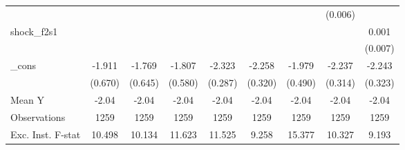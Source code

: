 {\begin{tabular}{l*{8}{c}}
            &                     &                     &                     &                     &                     &                     &     (0.006)         &                     \\
\addlinespace
shock\_f2s1  &                     &                     &                     &                     &                     &                     &                     &       0.001         \\
            &                     &                     &                     &                     &                     &                     &                     &     (0.007)         \\
\addlinespace
\_cons      &      -1.911\sym{***}&      -1.769\sym{***}&      -1.807\sym{***}&      -2.323\sym{***}&      -2.258\sym{***}&      -1.979\sym{***}&      -2.237\sym{***}&      -2.243\sym{***}\\
            &     (0.670)         &     (0.645)         &     (0.580)         &     (0.287)         &     (0.320)         &     (0.490)         &     (0.314)         &     (0.323)         \\
\midrule
Mean Y      &       -2.04         &       -2.04         &       -2.04         &       -2.04         &       -2.04         &       -2.04         &       -2.04         &       -2.04         \\
Observations&        1259         &        1259         &        1259         &        1259         &        1259         &        1259         &        1259         &        1259         \\
Exc. Inst. F-stat&      10.498         &      10.134         &      11.623         &      11.525         &       9.258         &      15.377         &      10.327         &       9.193         \\
\bottomrule
\end{tabular}
}

